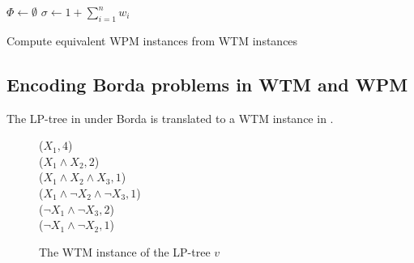 \begin{algorithm}[ht]
	$\Phi \leftarrow \emptyset$\;
	$\sigma \leftarrow 1+\sum^n_{i=1} w_i$\;
\Return{$\Phi$}
\caption{Compute equivalent WPM instances from WTM instances}
\label{alg:wtm_wpm}
\end{algorithm}


\subsection{Encoding Borda problems in WTM and WPM}
The LP-tree in  under Borda is translated to a WTM instance
in .
\begin{figure}[ht]
   \small
	\begin{framed}
		($X_1,4$)\\
		($X_1 \wedge X_2, 2$)\\
		($X_1 \wedge X_2 \wedge X_3, 1$)\\
		($X_1 \wedge \neg X_2 \wedge \neg X_3, 1$)\\
		($\neg X_1 \wedge \neg X_3, 2$)\\
		($\neg X_1 \wedge \neg X_2, 1$)
	\end{framed}
	\caption{The WTM instance of the LP-tree $v$}
  \label{fig:borda_wtm}
\end{figure}

